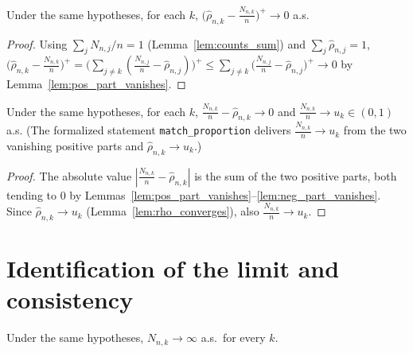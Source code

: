 \begin{lemma}\label{lem:neg_part_vanishes}
\leanok
{}
Under the same hypotheses, for each $k$,
$\big(\hat{\rho}_{n,k} - \frac{N_{n,k}}{n}\big)^+ \to 0$ a.s.
\end{lemma}

\begin{proof}\leanok
{}
Using $\sum_j N_{n,j}/n = 1$ (Lemma~\ref{lem:counts_sum}) and
$\sum_j \hat{\rho}_{n,j} = 1$,
$\big(\hat{\rho}_{n,k} - \frac{N_{n,k}}{n}\big)^+
 = \big(\sum_{j\ne k}(\frac{N_{n,j}}{n} - \hat{\rho}_{n,j})\big)^+
 \le \sum_{j\ne k}\big(\frac{N_{n,j}}{n} - \hat{\rho}_{n,j}\big)^+ \to 0$
by Lemma~\ref{lem:pos_part_vanishes}.
\end{proof}

\begin{lemma}\label{lem:match}
\leanok
{}
Under the same hypotheses, for each $k$,
$\frac{N_{n,k}}{n} - \hat{\rho}_{n,k} \to 0$ and
$\frac{N_{n,k}}{n} \to u_k \in (0,1)$ a.s. (The formalized statement \texttt{match\_proportion}
delivers $\frac{N_{n,k}}{n}\to u_k$ from the two vanishing positive parts and $\hat{\rho}_{n,k}\to
u_k$.)
\end{lemma}

\begin{proof}\leanok
{}
The absolute value $|\frac{N_{n,k}}{n}-\hat{\rho}_{n,k}|$ is the sum of the two
positive parts, both tending to $0$ by
Lemmas~\ref{lem:pos_part_vanishes}--\ref{lem:neg_part_vanishes}. Since
$\hat{\rho}_{n,k}\to u_k$ (Lemma~\ref{lem:rho_converges}), also
$\frac{N_{n,k}}{n}\to u_k$.
\end{proof}

\section{Identification of the limit and consistency}
\label{sec:cons_final}

\begin{lemma}\label{lem:all_arms_infinite}
\leanok
{}
Under the same hypotheses, $N_{n,k}\to\infty$ a.s.\ for every $k$.
\end{lemma}

